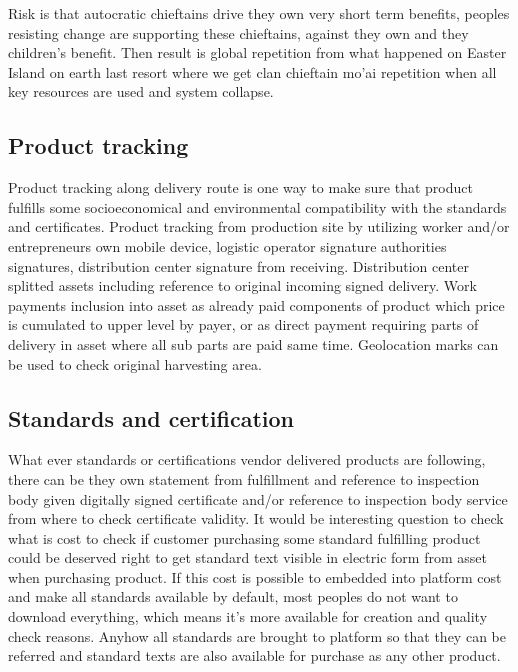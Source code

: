 Risk is that autocratic chieftains drive they own very short term benefits,
peoples resisting change are supporting these chieftains, against they own and
they children's benefit. Then result is global repetition from what happened
on Easter Island on earth last resort where we get clan chieftain mo'ai
repetition when all key resources are used and system collapse.

\subsection{Product tracking}
\label{product_tracking}

Product tracking along delivery route is one way to make sure that product
fulfills some socioeconomical and environmental compatibility with the
standards and certificates. Product tracking from production site by
utilizing worker and/or en\-tre\-pre\-neurs own mobile device, logistic
operator signature authorities signatures, distribution center signature from
receiving. Distribution center splitted assets including reference to original
incoming signed delivery. Work payments inclusion into asset as already paid
components of product which price is cumulated to upper level by payer, or as
direct payment requiring parts of delivery in asset where all sub parts are
paid same time. Geolocation marks can be used to check original harvesting
area.

\subsection{Standards and certification}
\label{standards_and_certification}

What ever standards or certifications vendor delivered products are following,
there can be they own statement from fulfillment and reference to inspection
body given digitally signed certificate and/or reference to inspection body
service from where to check certificate validity. It would be interesting
question to check what is cost to check if customer purchasing some standard
fulfilling product could be deserved right to get standard text visible in
electric form from asset when purchasing product. If this cost is possible to
embedded into platform cost and make all standards available by default, most
peoples do not want to download everything, which means it's more available
for creation and quality check reasons. Anyhow all standards are brought to
platform so that they can be referred and standard texts are also available
for purchase as any other product.

